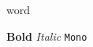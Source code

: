\documentclass{article}
\begin{document}
\noindent word \the\lastskip\par
\noindent \textbf{Bold} \textit{Italic} \texttt{Mono}\par
\end{document}
